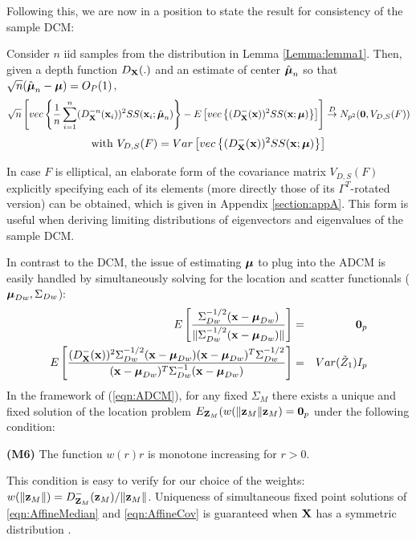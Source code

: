 Following this, we are now in a position to state the result for consistency of the sample DCM:

\begin{Theorem} \label{Theorem:rootn}
Consider $n$ iid samples from the distribution in Lemma \ref{Lemma:lemma1}. Then, given a depth function $D_{\mathbf{X}}(.)$ and an estimate of center $\hat{{\boldsymbol{\mu}}}_n$ so that $\sqrt n(\hat {{\boldsymbol{\mu}}}_n - {\boldsymbol{\mu}}) = O_P(1)$,
%
$$ \sqrt n \left[ vec\left\{ \frac{1}{n} \sum_{i=1}^n (D^{-n}_{\mathbf{X}} ({\bf{x}}_i))^2 SS({\bf{x}}_i; \hat{{\boldsymbol{\mu}}}_n) \right\} - E \left[ vec\left\{ (D^-_{\mathbf{X}} ({\bf{x}}))^2 SS({\bf{x}}; {\boldsymbol{\mu}}) \right\} \right] \right]
\stackrel{D}{\rightarrow}
N_{p^2} ({\bf 0}, V_{D,S}(F)) $$
$$ \text{with } V_{D,S}(F) = Var \left[vec \left\{ (D^-_{\mathbf{X}} ({\bf{x}}))^2 SS({\bf{x}}; {\boldsymbol{\mu}}) \right\} \right] $$
\end{Theorem}

\noindent In case $F$ is elliptical, an elaborate form of the covariance matrix $V_{D,S}(F)$ explicitly specifying each of its elements (more directly those of its $\Gamma^T$-rotated version) can be obtained, which is given in Appendix \ref{section:appA}. This form is useful when deriving limiting distributions of eigenvectors and eigenvalues of the sample DCM.

In contrast to the DCM, the issue of estimating ${\boldsymbol{\mu}}$ to plug into the ADCM is easily handled by simultaneously solving for the location and scatter functionals (${\boldsymbol{\mu}}_{Dw}, \Sigma_{Dw}$):
%
\begin{eqnarray}
E \left[ \frac{\Sigma_{Dw}^{-1/2} ({\bf{x}} - {\boldsymbol{\mu}}_{Dw})}{ \| \Sigma_{Dw}^{-1/2}({\bf{x}} - {\boldsymbol{\mu}}_{Dw}) \|} \right] &=& {\bf 0}_p \label{eqn:AffineMedian}\\
E \left[ \frac{(D^-_{\mathbf{X}}({\bf{x}}))^2 \Sigma_{Dw}^{-1/2} ({\bf{x}} - {\boldsymbol{\mu}}_{Dw}) ({\bf{x}} - {\boldsymbol{\mu}}_{Dw})^T \Sigma_{Dw}^{-1/2}}{({\bf{x}} - {\boldsymbol{\mu}}_{Dw})^T \Sigma_{Dw}^{-1} ({\bf{x}} - {\boldsymbol{\mu}}_{Dw})} \right] &=& Var (\tilde Z_1) I_p \label{eqn:AffineCov}
\end{eqnarray}
%
In the framework of (\ref{eqn:ADCM}), for any fixed $\Sigma_M$ there exists a unique and fixed solution of the location problem $E_{{\mathbf{Z}}_M} (w(\| {\bf{z}}_M \| {\bf{z}}_M) = {\bf 0}_p $ under the following condition:

\vspace{1em}
\noindent\textbf{(M6)} The function $w(r)r$ is monotone increasing for $r>0$.

\vspace{1em}
\noindent This condition is easy to verify for our choice of the weights: $w(\| {\bf{z}}_M \| ) = D^-_{{\mathbf{Z}}_M} ({\bf{z}}_M) / \| {\bf{z}}_M \|$. Uniqueness of simultaneous fixed point solutions of \ref{eqn:AffineMedian} and \ref{eqn:AffineCov} is guaranteed when ${\mathbf{X}}$ has a symmetric distribution \citep{HuberBook81}.

